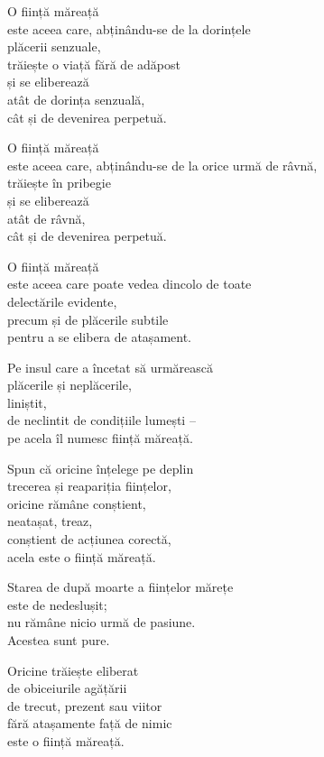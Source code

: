 O ființă măreață\\
este aceea care, abținându-se de la dorințele\\
plăcerii senzuale,\\
trăiește o viață fără de adăpost\\
și se eliberează\\
atât de dorința senzuală,\\
cât și de devenirea perpetuă.


O ființă măreață\\
este aceea care, abținându-se de la orice urmă de râvnă,\\
trăiește în pribegie\\
și se eliberează\\
atât de râvnă,\\
cât și de devenirea perpetuă.


O ființă măreață\\
este aceea care poate vedea dincolo de toate\\
delectările evidente,\\
precum și de plăcerile subtile\\
pentru a se elibera de atașament.


Pe insul care a încetat să urmărească\\
plăcerile și neplăcerile,\\
liniștit,\\
de neclintit de condițiile lumești –\\
pe acela îl numesc ființă măreață.


Spun că oricine înțelege pe deplin\\
trecerea și reapariția ființelor,\\
oricine rămâne conștient,\\
neatașat, treaz,\\
conștient de acțiunea corectă,\\
acela este o ființă măreață.


Starea de după moarte a ființelor mărețe\\
este de nedeslușit;\\
nu rămâne nicio urmă de pasiune.\\
Acestea sunt pure.


Oricine trăiește eliberat\\
de obiceiurile agățării\\
de trecut, prezent sau viitor\\
fără atașamente față de nimic\\
este o ființă măreață.


